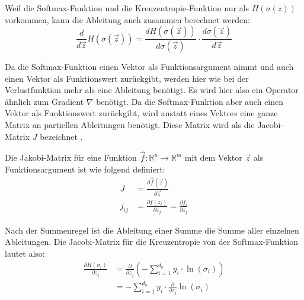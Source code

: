 \documentclass[12pt,titlepage]{article}
\begin{document}
Weil die Softmax-Funktion und die Kreuzentropie-Funktion nur als $H(\sigma(z))$ vorkommen, kann die Ableitung auch zusammen berechnet werden:
\[
  \frac{d}{d\vec{z}} H(\sigma(\vec{z})) = \frac{dH(\sigma(\vec{z}))}{d\sigma(\vec{z})} \cdot \frac{d\sigma(\vec{z})}{d\vec{z}}
\]

Da die Softmax-Funktion einen Vektor als Funktionsargument nimmt und auch einen Vektor als Funktionswert zurückgibt, werden hier wie bei der Verlustfunktion mehr als eine Ableitung benötigt. Es wird hier also ein Operator ähnlich zum Gradient $\nabla$ benötigt. Da die Softmax-Funktion aber auch einen Vektor als Funktionswert zurückgibt, wird anstatt eines Vektors eine ganze Matrix an partiellen Ableitungen benötigt. Diese Matrix wird als die Jacobi-Matrix $J$ bezeichnet \autocite{benderskySoftmaxFunctionIts}.

Die Jakobi-Matrix für eine Funktion $\vec{f} : \mathbb{R}^n \rightarrow \mathbb{R}^m$ mit dem Vektor $\vec{z}$ als Funktionsargument ist wie folgend definiert:
\[
  \begin{aligned}
    J      & = \frac{\partial \vec{f}(\vec{z})}{\partial \vec{z}}                       \\
    j_{ij} & = \frac{\partial f(z_i)}{\partial z_j} = \frac{\partial f_i}{\partial z_j}
  \end{aligned}
\]

Nach der Summenregel ist die Ableitung einer Summe die Summe aller einzelnen Ableitungen. Die Jacobi-Matrix für die Kreuzentropie von der Softmax-Funktion lautet also:
\[
  \begin{aligned}
    \frac{\partial H(\sigma_i) }{\partial z_j} & = \frac{\partial}{\partial z_j} \left( - \sum_{i=1}^{d_o} y_i \cdot \ln(\sigma_i) \right) \\
                                               & = - \sum_{i=1}^{d_o} y_i \cdot \frac{\partial}{\partial z_j} \ln(\sigma_i)
  \end{aligned}
\]
\end{document}
